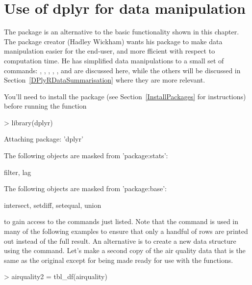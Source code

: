  
 
\section{Use of dplyr for data manipulation} 
\label{DPlyRDataManipulation} 
 
The  package is an alternative to the basic \R{} functionality shown in this chapter. The package creator (Hadley Wickham) wants his package to make data manipulation easier for the end-user, and more fficient with respect to computation time. He has simplified data manipulations to a small set of commands: , , , , , and  are discussed here, while the others will be discussed in Section~\ref{DPlyRDataSummarisation}  where they are more relevant. 
 
You'll need to install the package (see Section~\ref{InstallPackages} for instructions) before running the function 

\begin{Schunk}
\begin{Sinput}
> library(dplyr) 
\end{Sinput}
\begin{Soutput}

Attaching package: 'dplyr'
\end{Soutput}
\begin{Soutput}
The following objects are masked from 'package:stats':

    filter, lag
\end{Soutput}
\begin{Soutput}
The following objects are masked from 'package:base':

    intersect, setdiff, setequal, union
\end{Soutput}
\end{Schunk}

to gain access to the commands just listed. Note that the  command is used in many of the following examples to ensure that only a handful of rows are printed out instead of the full result. An alternative is to create a new data structure using the  command. Let's make a second copy of the air quality data that is the same as the original except for being made ready for use with the  functions. 

\begin{Schunk}
\begin{Sinput}
> airquality2 = tbl_df(airquality) 
\end{Sinput}
\end{Schunk}

